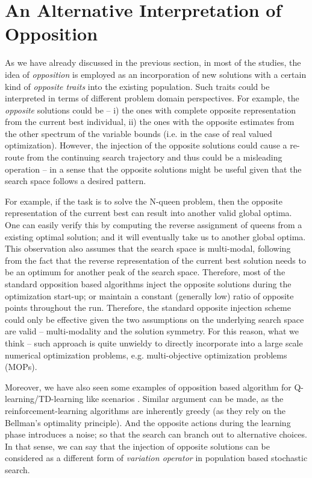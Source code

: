 \documentclass{sig-alternate-05-2015}
\begin{document}
\section{An Alternative Interpretation of Opposition}
\label{sec:alternative-interpretation}
As we have already discussed in the previous section, in most of the studies, the idea of \textit{opposition} is employed as an incorporation of new solutions with a certain kind of \textit{opposite traits} into the existing population. Such traits could be interpreted in terms of different problem domain perspectives. For example, the \textit{opposite} solutions could be -- i) the ones with complete opposite representation from the current best individual, ii) the ones with the opposite estimates from the other spectrum of the variable bounds (i.e. in the case of real valued optimization). However, the injection of the opposite solutions could cause a re-route from the continuing search trajectory and thus could be a misleading operation -- in a sense that the opposite solutions might be useful given that the search space follows a desired pattern. 

For example, if the task is to solve the N-queen problem, then the opposite representation of the current best can result into another valid global optima. One can easily verify this by computing the reverse assignment of queens from a existing optimal solution; and it will eventually take us to another global optima. This observation also assumes that the search space is multi-modal, following from the fact that the reverse representation of the current best solution needs to be an optimum for another peak of the search space. Therefore, most of the standard opposition based algorithms inject the opposite solutions during the optimization start-up; or maintain a constant (generally low) ratio of opposite points throughout the run. Therefore, the standard opposite injection scheme could only be effective given the two assumptions on the underlying search space are valid -- multi-modality and the solution symmetry. For this reason, what we think -- such approach is quite unwieldy to directly incorporate into a large scale numerical optimization problems, e.g. multi-objective optimization problems (MOPs).

Moreover, we have also seen some examples of opposition based algorithm for Q-learning/TD-learning like scenarios \cite{obl-rl}. Similar argument can be made, as the reinforcement-learning algorithms are inherently greedy (as they rely on the Bellman's optimality principle). And the opposite actions during the learning phase introduces a noise; so that the search can branch out to alternative choices. In that sense, we can say that the injection of opposite solutions can be considered as a different form of \textit{variation operator} in population based stochastic search. 
\end{document}
